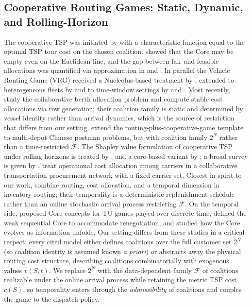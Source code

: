 \documentclass[11pt]{article}
\theoremstyle{plain}
\theoremstyle{definition}
\theoremstyle{remark}
\newcommand{\F}{\mathcal{F}}
\begin{document}
\subsection{Cooperative Routing Games: Static, Dynamic, and Rolling-Horizon}
The cooperative TSP was initiated by \citet{potters1992tsg} with a characteristic function equal to the optimal TSP tour cost on the chosen coalition. \citet{tamir1989core} showed that the Core may be empty even on the Euclidean line, and the gap between fair and feasible allocations was quantified via approximation in \citet{faigle1998approximate} and \citet{blaser2008metric}. In parallel the Vehicle Routing Game (VRG) received a Nucleolus-based treatment by \citet{gothe1996vrg}, extended to heterogeneous fleets by \citet{engevall2004heterogeneous} and to time-window settings by \citet{tae2020vrgtw} and \citet{arroyo2024vrptw}. Most recently, \citet{lyu2025collaborative} study the collaborative berth allocation problem and compute stable cost allocations via row generation; their coalition family is static and determined by vessel identity rather than arrival dynamics, which is the source of restriction that differs from our setting. \citet{platz2015multidepot} extend the routing-plus-cooperative-game template to multi-depot Chinese postman problems, but with coalition family $2^N$ rather than a time-restricted $\F$. The Shapley value formulation of cooperative TSP under rolling horizons is treated by \citet{kimms2016rolling}, and a core-based variant by \citet{kimms2016core}; a broad survey is given by \citet{guajardo2016review}. \citet{ozener2008allocating} treat operational cost allocation among carriers in a collaborative transportation procurement network with a fixed carrier set. Closest in spirit to our work, \citet{ozener2013allocating} combine routing, cost allocation, and a temporal dimension in inventory routing; their temporality is a deterministic replenishment schedule rather than an online stochastic arrival process restricting $\F$. On the temporal side, \citet{kranich2005dynamic} proposed Core concepts for TU games played over discrete time, \citet{habis2010weak} defined the weak sequential Core to accommodate renegotiation, and \citet{lehrer2013dynamic} studied how the Core evolves as information unfolds. Our setting differs from these studies in a critical respect: every cited model either defines coalitions over the full customer set $2^N$ (so coalition identity is assumed known \emph{a priori}) or abstracts away the physical routing cost structure, describing coalitions combinatorially with exogenous values $v(S,t)$. We replace $2^N$ with the data-dependent family $\F$ of coalitions realizable under the online arrival process while retaining the metric TSP cost $c(S)$, so temporality enters through the \emph{admissibility} of coalitions and couples the game to the dispatch policy.
\end{document}
